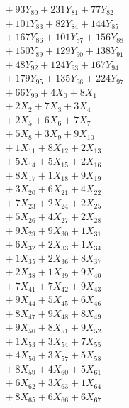 \documentclass[a4paper,10pt]{article}
\begin{document}
{\begin{align}
&\;  + 93 Y_{80} + 231 Y_{81} + 77 Y_{82} \\[0.3ex]
&\;  + 101 Y_{83} + 82 Y_{84} + 144 Y_{85} \\[0.3ex]
&\;  + 167 Y_{86} + 101 Y_{87} + 156 Y_{88} \\[0.5ex]\allowbreak
&\;  + 150 Y_{89} + 129 Y_{90} + 138 Y_{91} \\[0.3ex]
&\;  + 48 Y_{92} + 124 Y_{93} + 167 Y_{94} \\[0.3ex]
&\;  + 179 Y_{95} + 135 Y_{96} + 224 Y_{97} \\[0.3ex]
&\;  + 66 Y_{99} + 4 X_{0} + 8 X_{1} \\[0.3ex]
&\;  + 2 X_{2} + 7 X_{3} + 3 X_{4} \\[0.3ex]
&\;  + 2 X_{5} + 6 X_{6} + 7 X_{7} \\[0.3ex]
&\;  + 5 X_{8} + 3 X_{9} + 9 X_{10} \\[0.3ex]
&\;  + 1 X_{11} + 8 X_{12} + 2 X_{13} \\[0.3ex]
&\;  + 5 X_{14} + 5 X_{15} + 2 X_{16} \\[0.3ex]
&\;  + 8 X_{17} + 1 X_{18} + 9 X_{19} \\[0.5ex]\allowbreak
&\;  + 3 X_{20} + 6 X_{21} + 4 X_{22} \\[0.3ex]
&\;  + 7 X_{23} + 2 X_{24} + 2 X_{25} \\[0.3ex]
&\;  + 5 X_{26} + 4 X_{27} + 2 X_{28} \\[0.3ex]
&\;  + 9 X_{29} + 9 X_{30} + 1 X_{31} \\[0.3ex]
&\;  + 6 X_{32} + 2 X_{33} + 1 X_{34} \\[0.3ex]
&\;  + 1 X_{35} + 2 X_{36} + 8 X_{37} \\[0.3ex]
&\;  + 2 X_{38} + 1 X_{39} + 9 X_{40} \\[0.3ex]
&\;  + 7 X_{41} + 7 X_{42} + 9 X_{43} \\[0.3ex]
&\;  + 9 X_{44} + 5 X_{45} + 6 X_{46} \\[0.3ex]
&\;  + 8 X_{47} + 9 X_{48} + 8 X_{49} \\[0.5ex]\allowbreak
&\;  + 9 X_{50} + 8 X_{51} + 9 X_{52} \\[0.3ex]
&\;  + 1 X_{53} + 3 X_{54} + 7 X_{55} \\[0.3ex]
&\;  + 4 X_{56} + 3 X_{57} + 5 X_{58} \\[0.3ex]
&\;  + 8 X_{59} + 4 X_{60} + 5 X_{61} \\[0.3ex]
&\;  + 6 X_{62} + 3 X_{63} + 1 X_{64} \\[0.3ex]
&\;  + 8 X_{65} + 6 X_{66} + 6 X_{67} \\[0.3ex]

\end{align}}
\end{document}

